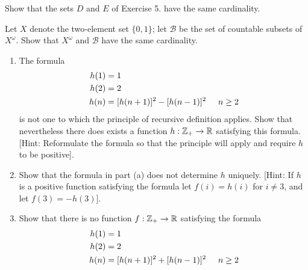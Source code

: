 \documentclass[12pt]{article}
\begin{document}
	 Show that the sets $D$ and $E$ of Exercise 5. have the 
	same cardinality.

	 Let $X$ denote the two-element set $\{0, 1\}$;
	let $\mathcal{B}$ be the set of countable subsets of $X^\omega$.
	Show that $X^\omega$ and $\mathcal{B}$ have the same cardinality.

	\begin{enumerate}[label=(\alph*)]
		\item The formula
		$$
		\begin{aligned}
			h(1) &= 1  \\
			h(2) &= 2  \\
			h(n) &= [h(n + 1)]^2 - [h(n - 1)]^2 \hspace{5mm} n \geq 2
		\end{aligned}
		$$
		is not one to which the principle of recursive definition 
		applies. Show that nevertheless there does exists a function 
		$h: \mathbb{Z}_{+} \to \mathbb{R}$ satisfying this formula. [Hint: Reformulate
		the formula so that the principle will apply and require $h$ to 
		be positive].

		\item Show that the formula in part (a) does not determine $h$
		uniquely. [Hint: If $h$ is a positive function satisfying the formula 
		let $f(i) = h(i)$ for $i \neq 3$, and let $f(3) = -h(3)$].
		
		\item Show that there is no function $f: \mathbb{Z}_{+} \to \mathbb{R}$ satisfying
		the formula 
		$$
		\begin{aligned}
			h(1) &= 1  \\
			h(2) &= 2  \\
			h(n) &= [h(n + 1)]^2 + [h(n - 1)]^2 \hspace{5mm} n \geq 2
		\end{aligned}
		$$
	\end{enumerate}
\end{document}
